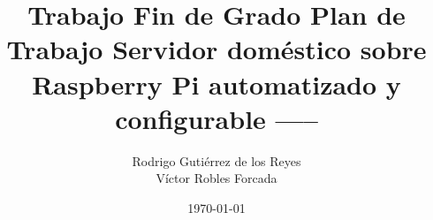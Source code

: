 \newcommand{\setTitle}{ Trabajo Fin de Grado }
\newcommand{\setSubTitle}{ Plan de Trabajo }
\newcommand{\setSubSubTitle}{ Servidor doméstico sobre Raspberry Pi automatizado y configurable }

\newcommand{\setAuthor}{ Rodrigo Gutiérrez de los Reyes }
\newcommand{\setTutor}{ Víctor Robles Forcada }
\newcommand{\setDepartment}{ Arquitectura y Tecnología de Sistemas Informáticos }
\newcommand{\setDegree}{ Ingeniería Informática }

\newcommand{\setDate}{ \today }

\title{
    \vspace{35px}
    \Huge \setTitle \vspace{25px} \break
    \Large \setSubTitle \vspace{25px} \break
    \large \setSubSubTitle \vspace{35px} \break
    \Large ----- \vspace{150px} \break
    \Large \vspace{5px} \break
}
\author{
    \large \setAuthor \vspace{10px} \break
    \\
    \large \setTutor \vspace{50px} \break
}
\date{ \setDate }
